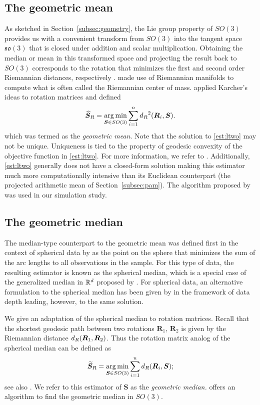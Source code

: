 \subsection{The geometric mean}
\label{section:ltwo}
As sketched in Section~\ref{subsec:geometry}, the Lie group property of $SO(3)$ provides us with a convenient transform from $SO(3)$
into the tangent space $\mathfrak{so}(3)$ that is closed under
addition and scalar multiplication.  Obtaining the median or mean
in this transformed space and projecting the result back to $SO(3)$ corresponds to the rotation that minimizes the first and second order Riemannian
distances, respectively \citep{karcher77, moakher02, fletcher08, fletcher09}.  \citet{karcher77} made use of Riemannian manifolds to compute what is often called the Riemannian
center of mass.  \citet{moakher02} applied Karcher's ideas to
rotation matrices and defined
\begin{equation}\label{est:ltwo}
{\widehat{\bm S}_R}=\operatorname*{arg\,min}_{\bm{S}\in
SO(3)}\sum_{i=1}^n{d_R}^2(\bm{R}_i,\bm{S}).
\end{equation}
which was termed as the \textit{geometric mean}.  Note that the solution to  \eqref{est:ltwo} may not be
unique. Uniqueness is tied to the property of geodesic convexity of the objective function in \eqref{est:ltwo}. For more information, we refer to \citet{moakher02}.  Additionally, \eqref{est:ltwo} generally does not have a closed-form solution making this estimator much more computationally intensive than its Euclidean counterpart (the projected arithmetic mean of Section~\ref{subsec:pam}).  The algorithm proposed by \citet{manton04} was used in our simulation study.

\subsection{The geometric median}
\label{subsec:lone}
The median-type counterpart to the geometric mean was defined first in the context of
spherical data by \citet{fisher85} as the point on the sphere that minimizes the sum of the arc lengths to all
observations in the sample.   For this type of data, the resulting estimator is known as the spherical median,
 which is a special case of the generalized median in ${\mathbb{R}}^d$
proposed by \citet{gower74}.   For spherical data, an alternative formulation to the
spherical median has been given by \citet{liu92} in the framework of
data depth leading, however, to the same solution.

We give an adaptation of the spherical median to rotation matrices. 
Recall that the shortest geodesic path between two rotations ${\bm R_1}$, ${\bm R_2}$ is given by the Riemannian distance ${d_R}(\bm R_1,\bm R_2)$.  Thus the rotation matrix analog of the \cite{fisher85} spherical
median can be defined as
\begin{equation}\label{est:lone}
{\widetilde{\bm S}_R}=\operatorname*{arg\,min}_{\bm{S}\in
SO(3)}\sum_{i=1}^n{d_R}(\bm{R}_i,\bm{S});
\end{equation}
see also \cite{fletcher08, fletcher09}.  We refer to this estimator of $\bm{S}$ as the \textit{geometric median.}  \citet{hartley11} offers an algorithm to find the geometric median in $SO(3)$.


